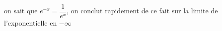 \documentclass[french]{book}
\newcommand{\R}{\mathbb {R}}
\newcommand{\N}{\mathbb {N}}
\newcommand{\tm}{\times}
\newcommand{\suite}[1][u]{\left( #1_{n} \right)_{n\in\N}}
\begin{document}
on sait que $e^{-x}=\dfrac{1}{e^x}$, on conclut rapidement de ce fait sur la limite de l'exponentielle en $- \infty$ 

\end{document}
